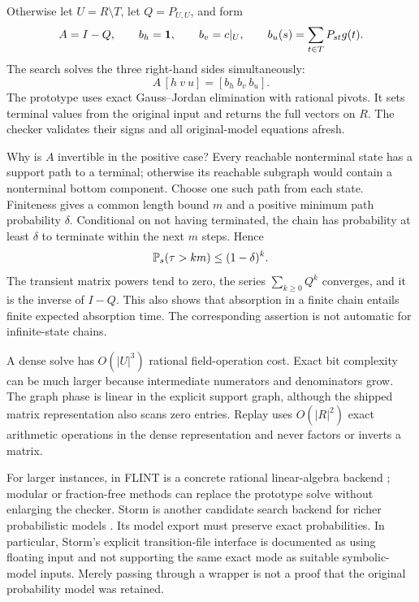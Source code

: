 Otherwise let $U=R\setminus T$, let $Q=P_{U,U}$, and form
\[
 A=I-Q,
 \qquad b_h=\mathbf{1},
 \qquad b_v=c|_U,
 \qquad b_u(s)=\sum_{t\in T}P_{st}g(t).
\]
The search solves the three right-hand sides simultaneously:
\begin{equation}
 A\,[h\ v\ u]=[b_h\ b_v\ b_u].
 \label{eq:matrix-solve}
\end{equation}
The prototype uses exact Gauss--Jordan elimination with rational pivots. It sets
terminal values from the original input and returns the full vectors on $R$.
The checker validates their signs and all original-model equations afresh.

Why is $A$ invertible in the positive case? Every reachable nonterminal state
has a support path to a terminal; otherwise its reachable subgraph would
contain a nonterminal bottom component. Choose one such path from each state.
Finiteness gives a common length bound $m$ and a positive minimum path
probability $\delta$. Conditional on not having terminated, the chain has
probability at least $\delta$ to terminate within the next $m$ steps. Hence
\[
 \mathbb{P}_s(\tau>km)\leq(1-\delta)^k.
\]
The transient matrix powers tend to zero, the series
$\sum_{k\geq0}Q^k$ converges, and it is the inverse of $I-Q$. This also shows
that absorption in a finite chain entails finite expected absorption time.
The corresponding assertion is not automatic for infinite-state chains.

A dense solve has $O(|U|^3)$ rational field-operation cost. Exact bit complexity
can be much larger because intermediate numerators and denominators grow.
The graph phase is linear in the explicit support graph, although the shipped
matrix representation also scans zero entries. Replay uses $O(|R|^2)$ exact
arithmetic operations in the dense representation and never factors or
inverts a matrix.

For larger instances,  in FLINT is a concrete rational
linear-algebra backend \cite{flint}; modular or fraction-free methods can
replace the prototype solve without enlarging the checker. Storm is another
candidate search backend for richer probabilistic models \cite{storm}. Its
model export must preserve exact probabilities. In particular, Storm's
explicit transition-file interface is documented as using floating input and
not supporting the same exact mode as suitable symbolic-model inputs. Merely
passing  through a wrapper is not a proof that the original
probability model was retained.

